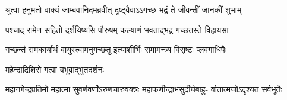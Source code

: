 \twolineshloka
{श्रुत्वा हनुमतो वाक्यं जाम्बवानिदमब्रवीत्}
{दृष्ट्वैवाऽऽगच्छ भद्रं ते जीवन्तीं जानकीं शुभाम्} %

\twolineshloka
{पश्चाद् रामेण सहितो दर्शयिष्यसि पौरुषम्}
{कल्याणं भवताद्भद्र गच्छतस्ते विहायसा} %

\twolineshloka
{गच्छन्तं रामकार्यार्थं वायुस्त्वामनुगच्छतु}
{इत्याशीर्भिः समामन्त्र्य विसृष्टः प्लवगाधिपैः} %

\onelineshloka
{महेन्द्राद्रिशिरो गत्वा बभूवाद्भुतदर्शनः} %

\fourlineindentedshloka
{महानगेन्द्रप्रतिमो महात्मा}
{सुवर्णवर्णोऽरुणचारुवक्त्रः}
{महाफणीन्द्राभसुदीर्घबाहु-}
{र्वातात्मजोऽदृश्यत सर्वभूतैः} %



